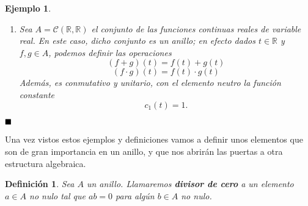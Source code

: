 \documentclass[12pt]{article}
\newtheorem{definition}[theorem]{Definición}
\newtheorem{example}{Ejemplo}[theorem]
\begin{document}
\begin{example}
\begin{enumerate}
$$\begin{matrix}
e_{11} & e_{12} \\
e_{21} & e_{22}
\end{matrix}
\right) \left( \begin{matrix}
\delta & 0 \\
0 & \delta
\end{matrix}
\right) = \left( \begin{matrix}
e_{11}\delta & e_{12}\delta \\
e_{21}\delta & e_{22}\delta
\end{matrix}
\right)$$ y, por tanto, $e_{11}\delta = e_{22}\delta = 1$, y así $\delta \in \mathcal{U}(A).$\vspace{0.2cm}\\ En resumen, $a \in \mathcal{U}(M_{2})$ si y sólo si $det(a) \in \mathcal{U}(A)$. Por ejemplo, si $A = \mathbb{Z}$, los enteros, $a$ será unidad si y sólo si $det(a) = \pm 1$. Pero si $A = \mathbb{Q}$ (ó cualquier cuerpo), $a$ será unidad si y sólo si $det(a) \neq 0$, ya que en un cuerpo todos los elementos menos el $0$ son unidades.\vspace{0.2cm}\\ De todo esto podemos decir que el \textbf{determinante} nos puede caracterizar las unidades y nos permite, como ya sabemos del álgebra lineal, el cálculo de inversos. Si lo vemos como un homomorfismo de grupos, es fácil demostrar que, dados $a,b \in M_{2}$ $$det(ab) = det(a)det(b).$$ Finalmente apuntar que todo lo visto en este ejemplo es aplicable para matrices de un orden $n \geq 2$ cualquiera.
\item Sea $A = \mathcal{C}(\mathbb{R}, \mathbb{R})$ el conjunto de las funciones continuas reales de variable real. En este caso, dicho conjunto es un anillo; en efecto dados $t \in \mathbb{R}$ y $f,g \in A$, podemos definir las operaciones $$(f+g)(t) = f(t) + g(t)$$ $$(f \cdot g)(t) = f(t) \cdot g(t)$$
Además, es conmutativo y unitario, con el elemento neutro la función constante $$c_{1}(t) = 1.$$
\end{enumerate}
\end{example}

$\hfill \blacksquare$

Una vez vistos estos ejemplos y definiciones vamos a definir unos elementos que son de gran importancia en un anillo, y que nos abrirán las puertas a otra estructura algebraica.

\begin{definition}Sea $A$ un anillo. Llamaremos \textbf{divisor de cero} a un elemento $a \in A$ no nulo tal que $ab = 0$ para algún $b \in A$ no nulo.
\end{definition}
\end{document}
